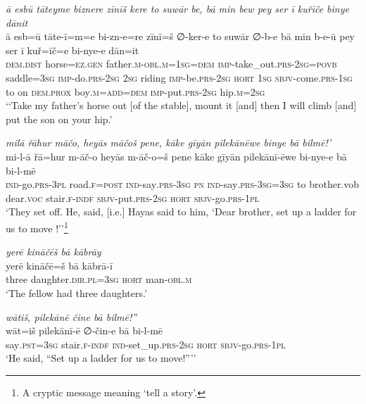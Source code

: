 \ea \label{KŠ.96}
\textit{ā esbū tāteyme biznere zīnīš kere to suwār be, bā min bew pey ser ī kuřīče binye dānit} \\ 
\gll ā esb=ū tāte-ī=m=e bi-zn-e=re zīnī=š ∅-ker-e to suwār ∅-b-e bā min b-e-ū pey ser ī kuř=īč=e bi-nye-e dān=it \\ 
 \textsc{dem.dist} horse\textsc{\textsc{=ez.gen}} father\textsc{.m}\textsc{-obl}\textsc{.m}\textsc{=\textsc{1sg}}\textsc{=dem} \textsc{imp-}take\_out\textsc{.prs}-\textsc{2sg}\textsc{=\textsc{povb}} saddle\textsc{=3sg} \textsc{imp-}do\textsc{.prs}-\textsc{2sg} \textsc{2sg} riding \textsc{imp-}be\textsc{.prs}-\textsc{2sg} \textsc{hort} \textsc{1sg} \textsc{sbjv-}come\textsc{.prs}\textsc{-\textsc{1sg}} to on \textsc{dem.prox} boy\textsc{.m}\textsc{=add}\textsc{=dem} \textsc{imp-}put\textsc{.prs}-\textsc{2sg} hip\textsc{.m}\textsc{=\textsc{2sg}} \\ 
\glt `‘Take my father’s horse out [of the stable], mount it [and] then I will climb [and] put the son on your hip.'
\z 
 
\ea \label{ŽH.12}
\textit{milā řāhur māčo, heyās māčoš pene, kāke gīyān pilekānēwe binye bā bilmē!’} \\ 
\gll mi-l-ā řā=hur m-āč-o heyās m-āč-o=š pene kāke gīyān pilekānī-ēwe bi-nye-e bā bi-l-mē \\ 
 \textsc{ind-}go\textsc{.prs}\textsc{-3pl} road\textsc{\textsc{.f}}\textsc{=\textsc{post}} \textsc{ind-}say\textsc{.prs}\textsc{-3sg} \textsc{pn} \textsc{ind-}say\textsc{.prs}\textsc{-3sg}\textsc{=3sg} to brother.vob dear.\textsc{voc} stair\textsc{\textsc{.f}}\textsc{-indf} \textsc{sbjv-}put\textsc{.prs}-\textsc{2sg} \textsc{hort} \textsc{sbjv-}go\textsc{.prs}\textsc{-1pl} \\ 
\glt `They set off. He, said, [i.e.] Hayas said to him, ‘Dear brother, set up a ladder for us to move !’'\footnote{A cryptic message meaning ‘tell a story’.}
\z 
 
\ea \label{ŽH.21}
\textit{yerē kināčēš bā kābrāy} \\ 
\gll yerē kināčē=š bā kābrā-ī \\ 
 three daughter\textsc{.dir}\textsc{.pl}\textsc{=3sg} \textsc{hort} man\textsc{-obl}\textsc{.m} \\ 
\glt `The fellow had three daughters.'
\z 
 
\ea \label{ŽH.25}
\textit{wātiš, pilekānē čine bā bilmē!”} \\ 
\gll wāt=iš pilekānī-ē ∅-čin-e bā bi-l-mē \\ 
 say\textsc{.pst}\textsc{=3sg} stair\textsc{\textsc{.f}}\textsc{-indf} \textsc{ind-}set\_up\textsc{.prs}-\textsc{2sg} \textsc{hort} \textsc{sbjv-}go\textsc{.prs}\textsc{-1pl} \\ 
\glt `He said, “Set up a ladder for us to move!”’'
\z 
 
